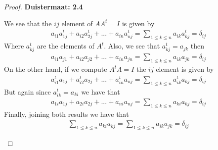 \documentclass[11pt]{article}
\theoremstyle{definition}
\begin{document}
\begin{proof}{\textbf{Duistermaat: 2.4}}
\begin{itemize}
        We see that the $ij$ element of $AA^t = I$ is given by
        \begin{align*}
           a_{i1}a^t_{1j} + a_{i2}a^t_{2j} + ... + a_{in}a^t_{nj}
           = \sum_{1\leq k\leq n} a_{ik}a^t_{kj} = \delta_{ij}
        \end{align*}
        Where $a^t_{kj}$ are the elements of $A^t$.
        Also, we see that $a^t_{kj} = a_{jk}$ then
        \begin{align*}
            a_{i1}a_{j1} + a_{i2}a_{j2} + ... + a_{in}a_{jn}
            = \sum_{1\leq k\leq n} a_{ik}a_{jk} = \delta_{ij}
        \end{align*}
        On the other hand, if we compute $A^tA = I$ the $ij$ element is given by
        \begin{align*}
            a^t_{i1}a_{1j} + a^t_{i2}a_{2j} + ... + a^t_{in}a_{nj}
            = \sum_{1\leq k\leq n} a^t_{ik}a_{kj} = \delta_{ij}
        \end{align*}
        But again since $a^t_{ik} = a_{ki}$ we have that 
        \begin{align*}
            a_{1i}a_{1j} + a_{2i}a_{2j} + ... + a_{ni}a_{nj}
            = \sum_{1\leq k\leq n} a_{ki}a_{kj} = \delta_{ij}
        \end{align*}
        Finally, joining both results we have that
        \begin{align*}
            \sum_{1\leq k\leq n} a_{ki}a_{kj}
            = \sum_{1\leq k\leq n} a_{ik}a_{jk} = \delta_{ij}
        \end{align*} 
    \end{itemize}   
\end{proof}
\cleardoublepage
\end{document}
